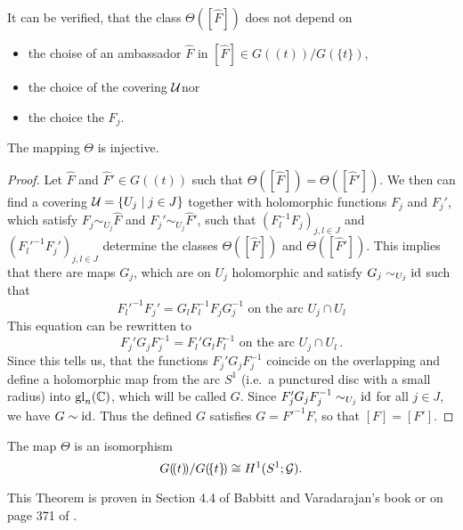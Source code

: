It can be verified, that the class $\Theta([\hat F])$ does not depend on
\begin{itemize}
  \item the choise of an ambassador $\hat F$ in
    $[\hat F]\in G(\!(t)\!)/G(\!\{t\}\!)$\PROBLEM[proof!],
  \item the choice of the covering $\mathcal{U}$\PROBLEM[proof!] nor
  \item the choice the $F_j$\PROBLEM[proof!].
\end{itemize}
\begin{lem}
  The mapping $\Theta$ is injective.
\end{lem}
\begin{proof}
  Let $\hat F$ and $\hat F'\in G(\!(t)\!)$ such that
  $\Theta([\hat F])=\Theta([\hat F'])$.
  We then can find a covering $\mathcal{U}=\{U_j\mid j\in J\}$ together with
  holomorphic functions $F_j$ and $F_j'$, which satisfy
  $F_j\sim_{U_j}\hat F$ and $F_j'\sim_{U_j}\hat F'$, such that
  $(F_l^{-1}F_j)_{j,l\in J}$ and $(F_l'^{-1}F_j')_{j,l\in J}$ determine the
  classes $\Theta([\hat F])$ and $\Theta([\hat F'])$.
  This implies that there are maps $G_j$, which are on $U_j$ holomorphic and
  satisfy $G_j\sim_{U_j}\operatorname{id}$ such that
  \[
    F_l'^{-1}F_j'=G_lF_l^{-1}F_jG_j^{-1}
    \text{~on~the~arc~} U_j\cap U_l
  \]
  This equation can be rewritten to
  \[
    F_j'G_jF_j^{-1}=F_l'G_lF_l^{-1}
    \text{~on~the~arc~} U_j\cap U_l \,.
  \]
  Since this tells us, that the functions $F_j'G_jF_j^{-1}$ coincide on
  the overlapping and define a holomorphic map from the arc $S^1$ (i.e.\ a
  punctured disc with a small radius) into $\operatorname{gl}_n(\mathbb{C})$, which will be called
  $G$.
  Since $F_j'G_jF_j^{-1}\sim_{U_j}\operatorname{id}$ for all $j\in J$, we have
  $G\sim\operatorname{id}$.
  Thus the defined $G$ satisfies $G=F'^{-1}F$, so that $[F]=[F']$.
\end{proof}
\begin{thm}\label{thm:thm1helpMalgSibuy}
  The map $\Theta$ is an isomorphism
  \[
    G(\!(t)\!)/G(\!\{t\}\!)\cong H^1(S^1;\mathcal{G}).
  \]
\end{thm}
This Theorem is proven in Section 4.4 of Babbitt and Varadarajan's book
\cite{babbitt1989local} or on page 371 of \cite{Martinet1991}.

